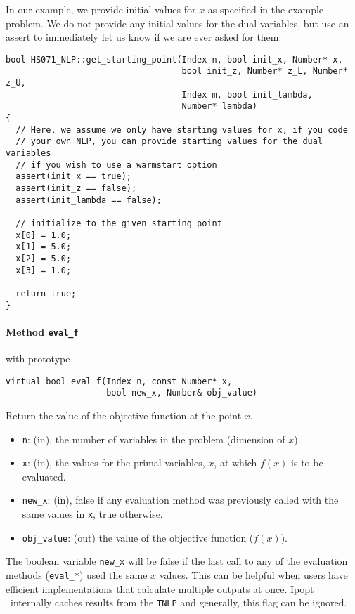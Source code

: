 \documentclass[10pt]{article}
\newcommand{\Ipopt}{{\sc Ipopt }}
\begin{document}
In our example, we provide initial values for $x$ as specified in the
example problem. We do not provide any initial values for the dual
variables, but use an assert to immediately let us know if we are ever
asked for them.

\begin{footnotesize}
\begin{verbatim}
bool HS071_NLP::get_starting_point(Index n, bool init_x, Number* x,
                                   bool init_z, Number* z_L, Number* z_U,
                                   Index m, bool init_lambda,
                                   Number* lambda)
{
  // Here, we assume we only have starting values for x, if you code
  // your own NLP, you can provide starting values for the dual variables
  // if you wish to use a warmstart option
  assert(init_x == true);
  assert(init_z == false);
  assert(init_lambda == false);

  // initialize to the given starting point
  x[0] = 1.0;
  x[1] = 5.0;
  x[2] = 5.0;
  x[3] = 1.0;

  return true;
}
\end{verbatim}
\end{footnotesize}

\paragraph{Method {\texttt{eval\_f}}} with prototype
\begin{verbatim}
virtual bool eval_f(Index n, const Number* x, 
                    bool new_x, Number& obj_value)
\end{verbatim}
Return the value of the objective function at the point $x$.
\begin{itemize}
\item {\tt n}: (in), the number of variables in the problem (dimension
  of $x$).
\item {\tt x}: (in), the values for the primal variables, $x$, at which
  $f(x)$ is to be evaluated.
\item {\tt new\_x}: (in), false if any evaluation method was
  previously called with the same values in {\tt x}, true otherwise.
\item {\tt obj\_value}: (out) the value of the objective function
  ($f(x)$).
\end{itemize}

The boolean variable {\tt new\_x} will be false if the last call to
any of the evaluation methods ({\tt eval\_*}) used the same $x$
values. This can be helpful when users have efficient implementations
that calculate multiple outputs at once. \Ipopt\ internally caches
results from the {\tt TNLP} and generally, this flag can be ignored.
\end{document}
